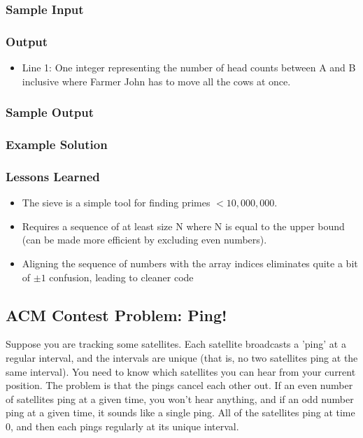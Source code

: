 \subsubsection{Sample Input}

\subsubsection{Output}
\begin{itemize}
	\item Line 1: One integer representing the number of head counts between A and B inclusive where Farmer John has to move all the cows at once.
\end{itemize}

\subsubsection{Sample Output}

\subsubsection{Example Solution}

\subsubsection{Lessons Learned}
\begin{itemize}
	\item The sieve is a simple tool for finding primes $<10,000,000$.
	\item Requires a sequence of at least size N where N is equal to the upper bound (can be made more efficient by excluding even numbers).
	\item Aligning the sequence of numbers with the array indices eliminates quite a bit of $\pm1$ confusion, leading to cleaner code
\end{itemize}

\subsection{ACM Contest Problem: Ping!\cite{acmsoutheastregional2013}}
Suppose you are tracking some satellites.
Each satellite broadcasts a 'ping' at a regular interval, and the intervals are unique (that is, no two satellites ping at the same interval).
You need to know which satellites you can hear from your current position.
The problem is that the pings cancel each other out.
If an even number of satellites ping at a given time, you won't hear anything, and if an odd number ping at a given time, it sounds like a single ping.
All of the satellites ping at time 0, and then each pings regularly at its unique interval.

